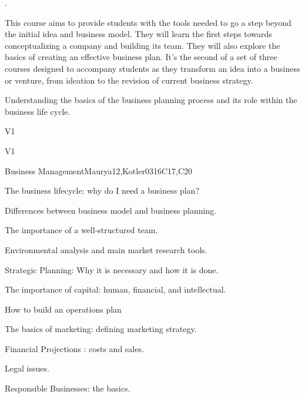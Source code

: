 \begin{syllabus}


\begin{justification}
.
\end{justification}
This course aims to provide students with the tools needed to go a step beyond the initial idea and business model. They will learn the first steps towards conceptualizing a company and building its team. They will also explore the basics of creating an effective business plan. It’s the second of a set of three courses
designed to accompany students as they transform an idea into a business or venture, from ideation to the revision of current business strategy.
\begin{goals}
\item Understanding the basics of the business planning process and its role within the business life cycle.
\end{goals}

\begin{outcomes}{V1}
   \item {}
   \item {}
   \item {}
\end{outcomes}

\begin{competences}{V1}
    \item {}
    \item {}
    \item {}
\end{competences}

\begin{unit}{Business Management}{}{Maurya12,Kotler03}{16}{C17,C20}
\begin{topics}
      \item The business lifecycle: why do I need a business plan?
      \item Differences between business model and business planning.
      \item The importance of a well-structured team.
      \item Environmental analysis and main market research tools.
      \item Strategic Planning: Why it is necessary and how it is done.
      \item The importance of capital: human, financial, and intellectual.
      \item How to build an operations plan
      \item The basics of marketing: defining marketing strategy.
      \item Financial Projections : costs and sales.
      \item Legal issues.
      \item Responsible Businesses: the basics.
\end{topics}


\end{unit}
\end{syllabus}
